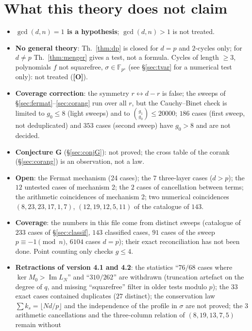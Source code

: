 \documentclass[11pt,a4paper]{article}
\newcommand{\F}{\mathbb{F}}
\begin{document}
\section{What this theory does not claim}

\begin{itemize}
\item \textbf{$\gcd(d,n)=1$ is a hypothesis}; $\gcd(d,n)>1$ is not treated.
\item \textbf{No general theory}: Th.~\ref{thm:dp} is closed for $d=p$ and
$2$-cycles only; for $d\ne p$ Th.~\ref{thm:menger} gives a test, not a formula.
Cycles of length $\ge3$, polynomials $f$ not squarefree, $\sigma\in\F_{p^s}$ (see
\S\ref{sec:tvar} for a numerical test only): not treated (\textbf{[O]}).
\item \textbf{Coverage correction}: the symmetry $r\leftrightarrow d-r$ is false;
the sweeps of \S\ref{sec:fermat}--\ref{sec:corang} run over all $r$, but the
Cauchy--Binet check is limited to $g_0\le8$ (light sweeps) and to
$\binom{g_1}{g_0}\le20000$; $186$ cases (first sweep, not deduplicated) and $353$
cases (second sweep) have $g_0>8$ and are not decided.
\item \textbf{Conjecture G} (\S\ref{sec:conjG}): not proved; the cross table of
the corank (\S\ref{sec:corang}) is an observation, not a law.
\item \textbf{Open}: the Fermat mechanism (24 cases); the $7$ three-layer cases
($d>p$); the $12$ untested cases of mechanism 2; the $2$ cases of cancellation
between terms; the arithmetic coincidences of mechanism 2; two numerical
coincidences $(8,23,23,17,1,7)$, $(12,19,12,5,11)$ of the catalogue of $143$.
\item \textbf{Coverage}: the numbers in this file come from distinct sweeps
(catalogue of $233$ cases of \S\ref{sec:classif}, $143$ classified cases, $91$
cases of the sweep $p\equiv-1\pmod n$, $6104$ cases $d=p$); their exact
reconciliation has not been done. Point counting only checks $g\le4$.
\item \textbf{Retractions of version 4.1 and 4.2}: the statistics ``$76/68$ cases
where $\ker M_0>\operatorname{Im}L_N$'' and ``$310/262$'' are withdrawn
(truncation artefact on the degree of $q$, and missing ``squarefree'' filter in
older tests modulo $p$); the $33$ exact cases contained duplicates ($27$
distinct); the conservation law $\sum k_s=\lfloor Nd/p\rfloor$ and the
independence of the profile in $\sigma$ are not proved; the $3$ arithmetic
cancellations and the three-column relation of $(8,19,13,7,5)$ remain without

\end{itemize}
\end{document}
